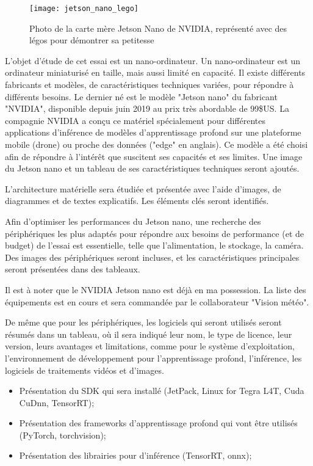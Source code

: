 \label{jetson_nano_lego}
\begin{figure}
    \centering
    \texttt{[image: jetson\_nano\_lego]}
    \caption{Photo de la carte mère Jetson Nano de NVIDIA, représenté avec des légos pour démontrer sa petitesse}
    \label{fig:jetson_nano_lego}
\end{figure}

\par L'objet d'étude de cet essai est un nano-ordinateur. Un nano-ordinateur est un ordinateur miniaturisé en taille, mais aussi limité en capacité. Il existe différents fabricants et modèles, de caractéristiques techniques variées, pour répondre à différents besoins. Le dernier né est le modèle "Jetson nano" du fabricant "NVIDIA", disponible depuis juin 2019 au prix très abordable de 99\$US. La compagnie NVIDIA a conçu ce matériel spécialement pour différentes applications d'inférence de modèles d'apprentissage profond sur une plateforme mobile (drone) ou proche des données ("edge" en anglais). Ce modèle a été choisi afin de répondre à l'intérêt que suscitent ses capacités et ses limites. Une image du Jetson nano et un tableau de ses caractéristiques techniques seront ajoutés. 
\par L'architecture matérielle sera étudiée et présentée avec l'aide d'images, de diagrammes et de textes explicatifs. Les éléments clés seront identifiés.
\par Afin d'optimiser les performances du Jetson nano, une recherche des périphériques les plus adaptés pour répondre aux besoins de performance (et de budget) de l'essai est essentielle, telle que l'alimentation, le stockage, la caméra. Des images des périphériques seront incluses, et les caractéristiques principales seront présentées dans des tableaux.
\par Il est à noter que le NVIDIA Jetson nano est déjà en ma possession. La liste des équipements est en cours et sera commandée par le collaborateur "Vision météo".

\par De même que pour les périphériques, les logiciels qui seront utilisés seront résumés dans un tableau, où il sera indiqué leur nom, le type de licence, leur version, leurs avantages et limitations, comme pour le système d'exploitation, l'environnement de développement pour l'apprentissage profond, l'inférence, les logiciels de traitements vidéos et d'images. 
\begin{itemize}
   \item Présentation du SDK qui sera installé (JetPack, Linux for Tegra L4T, Cuda CuDnn, TensorRT);
   \item Présentation des frameworks d’apprentissage profond qui vont être utilisés (PyTorch, torchvision);
   \item Présentation des librairies pour d'inférence (TensorRT, onnx);
\end{itemize}